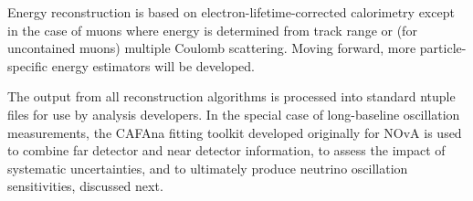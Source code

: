 Energy reconstruction is based on electron-lifetime-corrected calorimetry except in the case of muons where energy is determined from track range or (for uncontained muons) multiple Coulomb scattering.  Moving forward, more particle-specific energy estimators will be developed.

The output from all reconstruction algorithms is processed into standard ntuple files for use by analysis developers.  In the special case of long-baseline oscillation measurements, the CAFAna fitting toolkit developed originally for NOvA is used to combine far detector and near detector information, to assess the impact of systematic uncertainties, and to ultimately produce neutrino oscillation sensitivities, discussed next.
